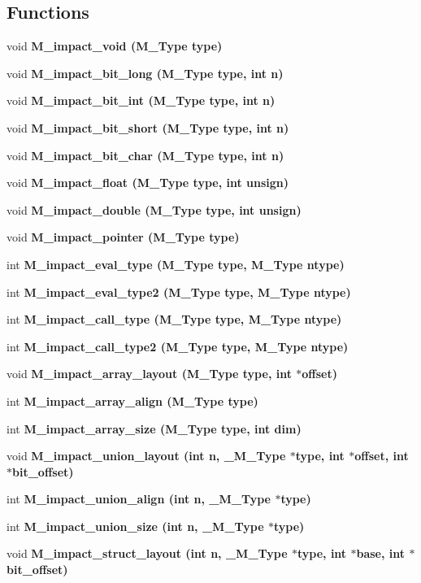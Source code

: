 \subsection*{Functions}
\begin{CompactItemize}
\item 
void \bf{M\_\-impact\_\-void} (\bf{M\_\-Type} type)
\item 
void \bf{M\_\-impact\_\-bit\_\-long} (\bf{M\_\-Type} type, int n)
\item 
void \bf{M\_\-impact\_\-bit\_\-int} (\bf{M\_\-Type} type, int n)
\item 
void \bf{M\_\-impact\_\-bit\_\-short} (\bf{M\_\-Type} type, int n)
\item 
void \bf{M\_\-impact\_\-bit\_\-char} (\bf{M\_\-Type} type, int n)
\item 
void \bf{M\_\-impact\_\-float} (\bf{M\_\-Type} type, int unsign)
\item 
void \bf{M\_\-impact\_\-double} (\bf{M\_\-Type} type, int unsign)
\item 
void \bf{M\_\-impact\_\-pointer} (\bf{M\_\-Type} type)
\item 
int \bf{M\_\-impact\_\-eval\_\-type} (\bf{M\_\-Type} type, \bf{M\_\-Type} ntype)
\item 
int \bf{M\_\-impact\_\-eval\_\-type2} (\bf{M\_\-Type} type, \bf{M\_\-Type} ntype)
\item 
int \bf{M\_\-impact\_\-call\_\-type} (\bf{M\_\-Type} type, \bf{M\_\-Type} ntype)
\item 
int \bf{M\_\-impact\_\-call\_\-type2} (\bf{M\_\-Type} type, \bf{M\_\-Type} ntype)
\item 
void \bf{M\_\-impact\_\-array\_\-layout} (\bf{M\_\-Type} type, int $\ast$offset)
\item 
int \bf{M\_\-impact\_\-array\_\-align} (\bf{M\_\-Type} type)
\item 
int \bf{M\_\-impact\_\-array\_\-size} (\bf{M\_\-Type} type, int dim)
\item 
void \bf{M\_\-impact\_\-union\_\-layout} (int n, \bf{\_\-M\_\-Type} $\ast$type, int $\ast$offset, int $\ast$bit\_\-offset)
\item 
int \bf{M\_\-impact\_\-union\_\-align} (int n, \bf{\_\-M\_\-Type} $\ast$type)
\item 
int \bf{M\_\-impact\_\-union\_\-size} (int n, \bf{\_\-M\_\-Type} $\ast$type)
\item 
void \bf{M\_\-impact\_\-struct\_\-layout} (int n, \bf{\_\-M\_\-Type} $\ast$type, int $\ast$base, int $\ast$bit\_\-offset)
\item 

\end{CompactItemize}
